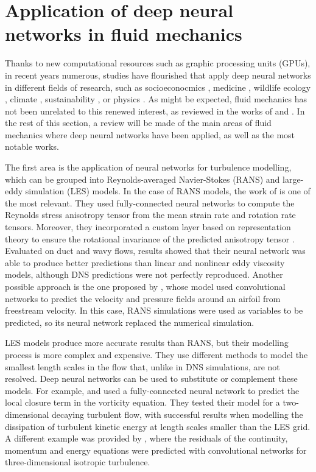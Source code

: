 \section{Application of deep neural networks in fluid mechanics}\label{ch03:s2}
%

Thanks to new computational resources such as graphic processing units (GPUs), in recent years numerous, studies have flourished that apply deep neural networks in different fields of research, such as socioeconocmics \citep{jean2016combining}, medicine \citep{de2018clinically,zeleznik2021deep}, wildlife ecology \citep{norouzzadeh2018automatically}, climate \citep{ham2019deep,waldmann2019mapping}, sustainability \citep{vinuesa2020role}, or physics \citep{udrescu2020ai,kwon2020magnetic}.
As might be expected, fluid mechanics has not been unrelated to this renewed interest, as reviewed in the works of \citet{kutz2017deep} and \citet{brunton2020machine}.
In the rest of this section, a review will be made of the main areas of fluid mechanics where deep neural networks have been applied, as well as the most notable works.

The first area is the application of neural networks for turbulence modelling, which can be grouped into Reynolds-averaged Navier-Stokes (RANS) and large-eddy simulation (LES) models.
In the case of RANS models, the work of \citet{ling2016reynolds} is one of the most relevant.
They used fully-connected neural networks to compute the Reynolds stress anisotropy tensor from the mean strain rate and rotation rate tensors.
Moreover, they incorporated a custom layer based on representation theory to ensure the rotational invariance of the predicted anisotropy tensor \citep{pope1975more}.
Evaluated on duct and wavy flows, results showed that their neural network was able to produce better predictions than linear and nonlinear eddy viscosity models, although DNS predictions were not perfectly reproduced.
Another possible approach is the one proposed by \citet{thuerey2020deep}, whose model used convolutional networks to predict the velocity and pressure fields around an airfoil from freestream velocity.
In this case, RANS simulations were used as variables to be predicted, so its neural network replaced the numerical simulation.

LES models produce more accurate results than RANS, but their modelling process is more complex and expensive.
They use different methods to model the smallest length scales in the flow that, unlike in DNS simulations, are not resolved.
Deep neural networks can be used to substitute or complement these models.
For example, \citet{maulik2017neural} and \citet{maulik2019subgrid} used a fully-connected neural network to predict the local closure term in the vorticity equation.
They tested their model for a two-dimensional decaying turbulent flow, with successful results when modelling the dissipation of turbulent kinetic energy at length scales smaller than the LES grid.
A different example was provided by \citet{beck2019deep}, where the residuals of the continuity, momentum and energy equations were predicted with convolutional networks for three-dimensional isotropic turbulence.

